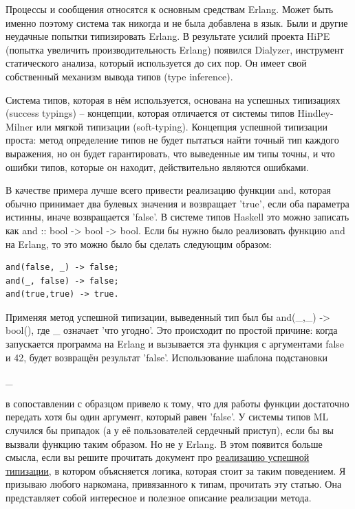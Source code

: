 \documentclass[a4paper,12pt]{report}
\newcommand{\ops}{\colorbox{lgreen}}
\begin{document}
Процессы и сообщения относятся к основным средствам Erlang. Может быть именно поэтому система так никогда и не была добавлена в язык. Были и другие неудачные попытки типизировать Erlang. В результате усилий проекта HiPE (попытка увеличить производительность Erlang) появился Dialyzer, инструмент статического анализа, который используется до сих пор. Он имеет свой собственный механизм вывода типов (type inference).

Система типов, которая в нём используется, основана на успешных типизациях (success typings) \--- концепции, которая отличается от системы типов Hindley\--Milner или мягкой типизации (soft\--typing). Концепция успешной типизации проста: метод определение типов не будет пытаться найти точный тип каждого выражения, но он будет гарантировать, что выведенные им типы точны, и что ошибки типов, которые он находит, действительно являются ошибками.

В качестве примера лучше всего привести реализацию функции \ops{and}, которая обычно принимает два булевых значения и возвращает 'true', если оба параметра истинны, иначе возвращается 'false'. В системе типов Haskell это можно записать как \ops{and :: bool -> bool -> bool}. Если бы нужно было реализовать функцию \ops{and} на Erlang, то это можно было бы сделать следующим образом:
\begin{lstlisting}[style=erlang]
and(false, _) -> false;
and(_, false) -> false;
and(true,true) -> true.
\end{lstlisting}

Применяя метод успешной типизации, выведенный тип был бы \ops{and(\_,\_) -> bool()}, где \_ означает 'что угодно'. Это происходит по простой причине: когда запускается программа на Erlang и вызывается эта функция с аргументами \ops{false} и \ops{42}, будет возвращён результат 'false'. Использование шаблона подстановки \ops{\strut\_} в сопоставлении с образцом привело к тому, что для работы функции достаточно передать хотя бы один аргумент, который равен 'false'. У системы типов ML случился бы припадок (а у её пользователей сердечный приступ), если бы вы вызвали функцию таким образом. Но не у Erlang. В этом появится больше смысла, если вы решите прочитать документ про \href{http://www.it.uu.se/research/group/hipe/papers/succ\_types.pdf}{реализацию успешной типизации}, в котором объясняется логика, которая стоит за таким поведением. Я призываю любого наркомана, привязанного к типам, прочитать эту статью. Она представляет собой интересное и полезное описание реализации метода.
\end{document}
